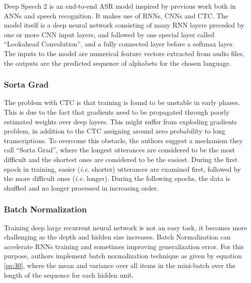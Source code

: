 
Deep Speech 2 is an end-to-end \ac{ASR} model inspired by previous work both in \ac{ANN}s and speech recognition. It makes use of \ac{RNN}s, \ac{CNN}s and \ac{CTC}. The model itself is a deep neural network consisting of many \ac{RNN} layers preceded by one or more \ac{CNN} input layers, and followed by one special layer called \enquote{Lookahead Convolution}, and a fully connected layer before a softmax layer. The inputs to the model are numerical feature vectors extracted from audio files, the outputs are the predicted sequence of alphabets for the chosen language.

\subsubsection{Sorta Grad}
\label{bg:s3_sub3_subsub1}

The problem with \ac{CTC} is that training is found to be unstable in early phases. This is due to the fact that gradients need to be propagated through poorly estimated weights over deep layers. This might suffer from exploding gradients problem, in addition to the \ac{CTC} assigning around zero probability to long transcriptions. To overcome this obstacle, the authors suggest a mechanism they call \enquote{Sorta Grad}, where the longest utterances are considered to be the most difficult and the shortest ones are considered to be the easiest. During the first epoch in training, easier (\textit{i.e.} shorter) utterances are examined first, followed by the more difficult ones (\textit{i.e.} longer). During the following epochs, the data is shuffled and no longer processed in increasing order.

\subsubsection{Batch Normalization}
\label{bg:s3_sub3_subsub2}

Training deep large recurrent neural network is not an easy task, it becomes more challenging as the depth and hidden size increases. Batch Normalization \cite{ioffe2015batch} can accelerate \ac{RNN}s training and sometimes improving generalization error. For this purpose, authors implement batch normalization technique as given by equation \ref{eq:30}, where the mean and variance over all items in the mini-batch over the length
of the sequence for each hidden unit.

